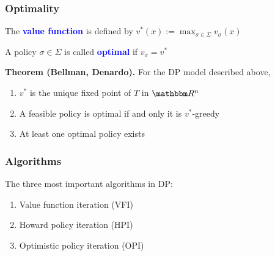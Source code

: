 \documentclass[xcolor=dvipsnames]{beamer}
\newcommand{\navy}[1]{\textcolor{Blue}{\bf #1}}
\newcommand{\RR}{\mathbbm R}
\newcommand{\1}{\mathbbm 1}
\begin{document}
\begin{frame}
    \frametitle{Optimality}

    \vspace{0.5em}
    The \navy{value function} is defined by $v^*(x) := \max_{\sigma \in \Sigma} v_\sigma(x)$

    \vspace{0.5em}
    A policy $\sigma \in \Sigma$ is called \navy{optimal} if $v_\sigma = v^*$

        \vspace{0.5em}
        \vspace{0.5em}
    \begin{block}{}
        {\bf Theorem (Bellman, Denardo).} For the DP model described above,
        \vspace{0.5em}
        \begin{enumerate}
            \item $v^*$ is the unique fixed point of $T$
                in $\RR^n$
            \vspace{0.5em}
            \vspace{0.5em}
            \item A feasible policy is optimal if and only it is
                $v^*$-greedy
            \vspace{0.5em}
            \vspace{0.5em}
            \item At least one optimal policy exists
        \end{enumerate}
    \end{block}



\end{frame}


\begin{frame}
    \frametitle{Algorithms}


    The three most important algorithms in DP:

        \vspace{0.5em}
        \vspace{0.5em}
    \begin{enumerate}
        \item Value function iteration (VFI)
        \vspace{0.5em}
        \vspace{0.5em}
        \item Howard policy iteration (HPI) 
        \vspace{0.5em}
        \vspace{0.5em}
        \item Optimistic policy iteration (OPI)
    \end{enumerate}


\end{frame}
\end{document}
